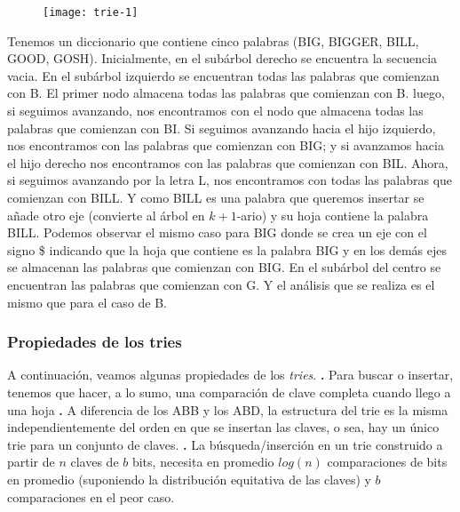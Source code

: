 \documentclass[10pt,a4paper]{article}
\begin{document}
\begin{figure}[h]
	\centering
\texttt{[image: trie-1]}
	\label{drivers1}
\end{figure} 

Tenemos un diccionario que contiene cinco palabras (BIG, BIGGER, BILL, GOOD, GOSH).
\newline
\newline
Inicialmente, en el subárbol derecho se encuentra la secuencia vacia.
\newline
\newline
En el subárbol izquierdo se encuentran todas las palabras que comienzan con B. El primer nodo almacena todas las palabras que comienzan con B. luego, si seguimos avanzando, nos encontramos con el nodo que almacena todas las palabras que comienzan con BI. Si seguimos avanzando hacia el hijo izquierdo, nos encontramos con las palabras que comienzan con BIG; y si avanzamos hacia el hijo derecho nos encontramos con las palabras que comienzan con BIL. Ahora, si seguimos avanzando por la letra L, nos encontramos con todas las palabras que comienzan con BILL. Y como BILL es una palabra que queremos insertar se añade otro eje (convierte al árbol en $k+1$-ario) y su hoja contiene la palabra BILL. Podemos observar el mismo caso para BIG donde se crea un eje con el signo \$ indicando que la hoja que contiene es la palabra BIG y en los demás ejes se almacenan las palabras que comienzan con BIG.
\newline
\newline
En el subárbol del centro se encuentran las palabras que comienzan con G. Y el análisis que se realiza es el mismo que para el caso de B.
\newpage

\subsubsection{Propiedades de los tries}

A continuación, veamos algunas propiedades de los \textit{tries}.
\newline
\newline
\textbf{.} Para buscar o insertar, tenemos que hacer, a lo sumo, una comparación de clave completa cuando llego a una hoja
\newline
\newline
\textbf{.} A diferencia de los ABB y los ABD, la estructura del trie es la misma independientemente del orden en que se insertan las claves, o sea, hay un único trie para un conjunto de claves.
\newline
\newline
\textbf{.} La búsqueda/inserción en un trie construido a partir de $n$ claves de $b$ bits, necesita en promedio $log(n)$ comparaciones de bits en promedio (suponiendo la distribución equitativa de las claves) y $b$ comparaciones en el peor caso.
\end{document}
